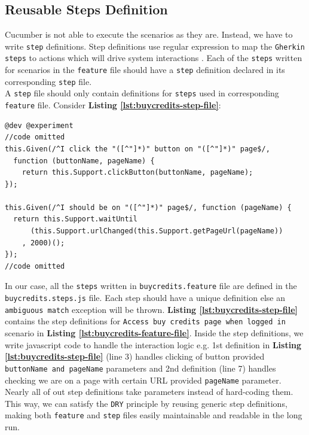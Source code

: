 \subsection{Reusable Steps Definition}
\label{subsec:reusable-steps-definition}

Cucumber is not able to execute the scenarios as they are. Instead, we have to write \texttt{step} definitions. Step definitions use regular expression to map the \texttt{Gherkin steps} to actions which will drive system interactions \cite{stepfile1}. Each of the \texttt{steps} written for scenarios in the \texttt{feature} file should have a \texttt{step} definition declared in its corresponding \texttt{step} file.\\ A \texttt{step} file should only contain definitions for \texttt{steps} used in corresponding \texttt{feature} file. Consider \textbf{Listing \ref{lst:buycredits-step-file}}:\\

\begin{listing}[H]
\begin{verbatim}
@dev @experiment
//code omitted
this.Given(/^I click the "([^"]*)" button on "([^"]*)" page$/,
  function (buttonName, pageName) {
    return this.Support.clickButton(buttonName, pageName);
});

this.Given(/^I should be on "([^"]*)" page$/, function (pageName) {
  return this.Support.waitUntil
      (this.Support.urlChanged(this.Support.getPageUrl(pageName))
    , 2000)();
});
//code omitted
\end{verbatim}
\label{lst:buycredits-step-file}
\end{listing}

In our case, all the \texttt{steps} written in \texttt{buycredits.feature} file are defined in the \texttt{buycredits.steps.js} file. Each step should have a unique definition else an \texttt{ambiguous match} exception will be thrown. \textbf{Listing \ref{lst:buycredits-step-file}} contains the step definitions for \texttt{Access buy credits page when logged in} scenario in \textbf{Listing \ref{lst:buycredits-feature-file}}. Inside the step definitions, we write javascript code to handle the interaction logic e.g. 1st definition in \textbf{Listing \ref{lst:buycredits-step-file}} (line 3) handles clicking of button provided  \texttt{buttonName and pageName} parameters and 2nd definition (line 7) handles checking we are on a page with certain URL provided  \texttt{pageName} parameter. Nearly all of out step definitions take parameters instead of hard-coding them. This way, we can satisfy the \texttt{DRY} principle by reusing generic step definitions, making both  \texttt{feature} and  \texttt{step} files easily maintainable and readable in the long run.

